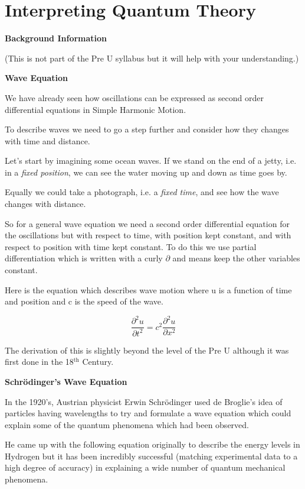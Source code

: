 \documentclass[revision-guide.tex]{subfiles}
\begin{document}
\chapter{Interpreting Quantum Theory}

\textbf{Background Information}

(This is not part of the Pre U syllabus but it will help with your understanding.)

\textbf{Wave Equation}

We have already seen how oscillations can be expressed as second order differential equations in Simple Harmonic Motion.

To describe waves we need to go a step further and consider how they changes with time and distance. 

Let's start by imagining some ocean waves. If we stand on the end of a jetty, i.e. in a \emph{fixed position}, we can see the water moving up and down as time goes by.

Equally we could take a photograph, i.e. a \emph{fixed time}, and see how the wave changes with distance.

So for a general wave equation we need a second order differential equation for the oscillations but with respect to time, with position kept constant, and with respect to position with time kept constant. To do this we use partial differentiation which is written with a curly $\partial$ and means keep the other variables constant. 

Here is the equation which describes wave motion where u is a function of time and position and c is the speed of the wave.

\[
\frac{\partial^2 u}{\partial t^2} = c^2 \frac{\partial^2 u}{\partial x^2}
\]

The derivation of this is slightly beyond the level of the Pre U although it was first done in the 18$^{\text{th}}$ Century.

\textbf{Schrödinger's Wave Equation}

In the 1920's, Austrian physicist Erwin Schrödinger used de Broglie's idea of particles having wavelengths to try and formulate a wave equation which could explain some of the quantum phenomena which had been observed.

He came up with the following equation originally to describe the energy levels in Hydrogen but it has been incredibly successful (matching experimental data to a high degree of accuracy) in explaining a wide number of quantum mechanical phenomena.
\end{document}
